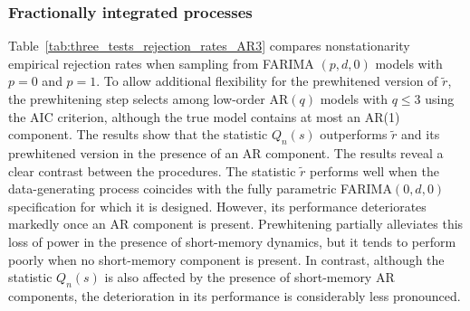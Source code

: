 \documentclass[10pt,a4paper]{amsart}
\numberwithin{equation}{section}
\begin{document}
\subsubsection{Fractionally integrated processes}
Table~\ref{tab:three_tests_rejection_rates_AR3} compares nonstationarity empirical rejection rates when sampling from FARIMA $(p,d,0)$ models with $p=0$ and $p=1$. To allow additional flexibility for the prewhitened version of $\tilde r$, the prewhitening step selects among low-order AR$(q)$ models with $q\le3$ using the AIC criterion, although the true model contains at most an AR(1) component. The results show that the statistic $Q_n(s)$ outperforms $\tilde r$ and its prewhitened version in the presence of an AR component. The results reveal a clear contrast between the procedures. The statistic $\tilde r$ performs well when the data-generating process coincides with the fully parametric FARIMA$(0,d,0)$ specification for which it is designed. However, its performance deteriorates markedly once an AR component is present. Prewhitening partially alleviates this loss of power in the presence of short-memory dynamics, but it tends to perform poorly when no short-memory component is present. In contrast, although the statistic $Q_n(s)$ is also affected by the presence of short-memory AR components, the deterioration in its performance is considerably less pronounced.
\end{document}
